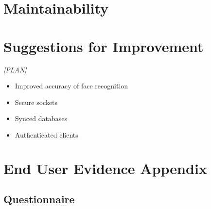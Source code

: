 \documentclass[a4paper]{article}
\begin{document}
\section{Maintainability}

\section{Suggestions for Improvement}

	\textit{[PLAN]}
	\begin{itemize}
		\item Improved accuracy of face recognition
		\item Secure sockets
		\item Synced databases
		\item Authenticated clients 
	\end{itemize}	

\section{End User Evidence Appendix}

	\subsection{Questionnaire}
\end{document}
